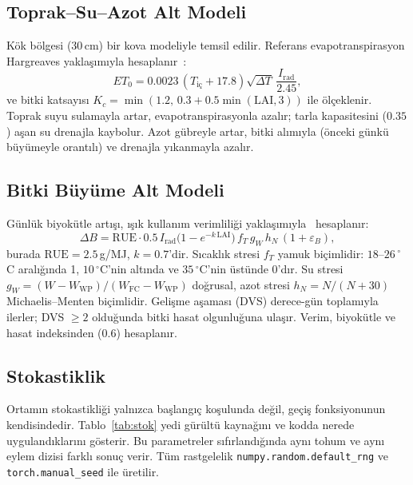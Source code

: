 \documentclass[conference,a4paper]{IEEEtran}
\newcommand{\cfg}[1]{\texttt{#1}}
\begin{document}
\subsection{Toprak--Su--Azot Alt Modeli}
Kök bölgesi (30\,cm) bir kova modeliyle temsil edilir. Referans evapotranspirasyon Hargreaves yaklaşımıyla hesaplanır~\cite{hargreaves1985}:
\begin{equation}
ET_0=0.0023\,(T_{\text{iç}}+17.8)\sqrt{\Delta T}\,\frac{I_{\mathrm{rad}}}{2.45},
\end{equation}
ve bitki katsayısı $K_c=\min(1.2,\,0.3+0.5\min(\mathrm{LAI},3))$ ile ölçeklenir. Toprak suyu sulamayla artar, evapotranspirasyonla azalır; tarla kapasitesini ($0.35$) aşan su drenajla kaybolur. Azot gübreyle artar, bitki alımıyla (önceki günkü büyümeyle orantılı) ve drenajla yıkanmayla azalır.

\subsection{Bitki Büyüme Alt Modeli}
Günlük biyokütle artışı, ışık kullanım verimliliği yaklaşımıyla~\cite{monteith1977} hesaplanır:
\begin{equation}
\Delta B=\mathrm{RUE}\cdot0.5\,I_{\mathrm{rad}}\big(1-e^{-k\,\mathrm{LAI}}\big)\,f_T\,g_W\,h_N\,(1+\varepsilon_B),
\end{equation}
burada $\mathrm{RUE}=2.5$\,g/MJ, $k=0.7$'dir. Sıcaklık stresi $f_T$ yamuk biçimlidir: $18$--$26\,^{\circ}$C aralığında 1, $10\,^{\circ}$C'nin altında ve $35\,^{\circ}$C'nin üstünde 0'dır. Su stresi $g_W=(W-W_{\mathrm{WP}})/(W_{\mathrm{FC}}-W_{\mathrm{WP}})$ doğrusal, azot stresi $h_N=N/(N+30)$ Michaelis--Menten biçimlidir. Gelişme aşaması (DVS) derece-gün toplamıyla ilerler; DVS $\geq2$ olduğunda bitki hasat olgunluğuna ulaşır. Verim, biyokütle ve hasat indeksinden ($0.6$) hesaplanır.

\subsection{Stokastiklik}
Ortamın stokastikliği yalnızca başlangıç koşulunda değil, geçiş fonksiyonunun kendisindedir. Tablo~\ref{tab:stok} yedi gürültü kaynağını ve kodda nerede uygulandıklarını gösterir. Bu parametreler sıfırlandığında aynı tohum ve aynı eylem dizisi farklı sonuç verir. Tüm rastgelelik \cfg{numpy.random.default\_rng} ve \cfg{torch.manual\_seed} ile üretilir.
\end{document}
